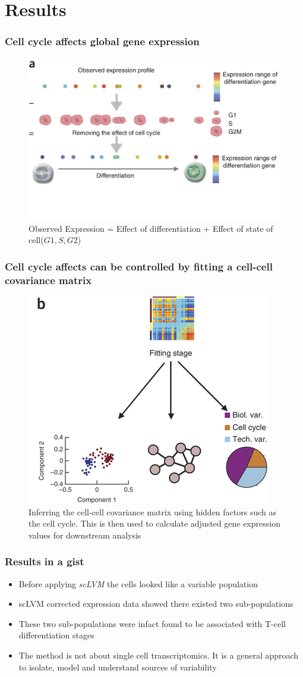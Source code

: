 \documentclass[10pt, compress]{beamer}
\renewcommand{\(}{\begin{columns}}
\renewcommand{\)}{\end{columns}}
\newcommand{\<}[1]{\begin{column}{#1}}
\renewcommand{\>}{\end{column}}
\begin{document}
\section{Results}
\begin{frame}
\frametitle{Cell cycle affects global gene expression}
\begin{figure}
\includegraphics[width=0.8\linewidth]{images/expression.jpg}
\caption{Observed Expression = Effect of differentiation + Effect of state of cell($G1,  S , G2$)}
\end{figure}
\end{frame}

\begin{frame}
\frametitle{Cell cycle affects can be controlled by fitting a cell-cell covariance matrix}
\begin{figure}
\includegraphics[width=0.5\linewidth]{images/fitting.jpg}
\caption{Inferring the cell-cell covariance matrix using hidden factors such as the cell cycle. This is then used to calculate adjusted
gene expression values for downstream analysis}
\end{figure}
\end{frame}


\begin{frame}
\frametitle{Results in a gist}
\begin{itemize}[<+- | alert@+>]
\item Before applying \textit{scLVM} the cells looked like a variable population
\item scLVM corrected expression data showed there existed two sub-populations
\item These two sub-populations were infact found to be associated with T-cell differentiation stages
\item The method is not about single cell transcriptomics. It is a general approach to isolate, model and understand sources of variability
\end{itemize}
\end{frame}
\end{document}
